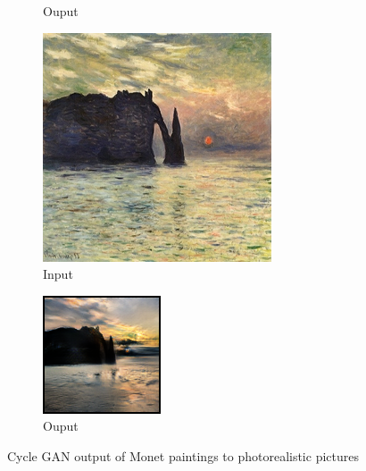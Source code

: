 \documentclass{article}
\begin{document}
\begin{figure}[H]
\begin{subfigure}{.112\textwidth}
        \caption{Ouput}
    \end{subfigure}\hspace{.010\textwidth}%
    \begin{subfigure}{.112\textwidth}
        \centering
        \includegraphics[width=\linewidth]{00860.jpg}
        \caption{Input}
    \end{subfigure}%
    \begin{subfigure}{.112\textwidth}
        \centering
        \includegraphics[width=\linewidth]{0076.png}
        \caption{Ouput}
    \end{subfigure}
    \caption{Cycle GAN output of Monet paintings to photorealistic pictures}
    \label{fig:my_label}
\end{figure}
\end{document}
